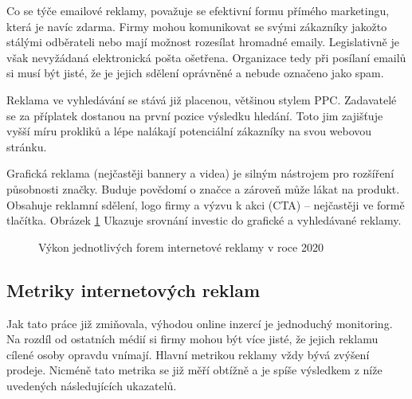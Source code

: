 Co se týče emailové reklamy, považuje se efektivní formu přímého marketingu, která je navíc zdarma.
Firmy mohou komunikovat se svými zákazníky jakožto stálými odběrateli nebo mají možnost rozesílat hromadné emaily. Legislativně je však nevyžádaná elektronická pošta ošetřena.
Organizace tedy při posílaní emailů si musí být jisté, že je jejich sdělení oprávněné a nebude označeno jako spam.

Reklama ve vyhledávání se stává již placenou, většinou stylem PPC. Zadavatelé se za příplatek dostanou na první pozice výsledku hledání.
Toto jim zajišťuje vyšší míru prokliků a lépe nalákají potenciální zákazníky na svou webovou stránku. 

Grafická reklama (nejčastěji bannery a videa) je silným nástrojem pro rozšíření působnosti značky. Buduje povědomí o značce a
zároveň může lákat na produkt. Obsahuje reklamní sdělení, logo firmy a výzvu k akci (CTA) -- nejčastěji ve formě tlačítka.
Obrázek \ref{fig:spir-ad-performance} Ukazuje srovnání investic do grafické a vyhledávané reklamy.

\begin{figure}[h]
    \centering
    \caption[Výkon reklam v roce 2020]{Výkon jednotlivých forem internetové reklamy v roce 2020 \cite{spir:mediatypes}}
    \label{fig:spir-ad-performance}
\end{figure}

    \subsection{Metriky internetových reklam}\label{ssec:online-ad-metrics}
    Jak tato práce již zmiňovala, výhodou online inzercí je jednoduchý monitoring. Na rozdíl od ostatních médií si firmy mohou být více jisté,
    že jejich reklamu cílené osoby opravdu vnímají. Hlavní metrikou reklamy vždy bývá zvýšení prodeje.
    Nicméně tato metrika se již měří obtížně a je spíše výsledkem z níže uvedených následujících ukazatelů.

